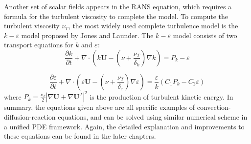 Another set of scalar fields appears in the RANS equation, which requires a formula for the turbulent viscosity to complete the model. To compute the turbulent viscosity $\nu_T$, the most widely used complete turbulence model is the $k-\varepsilon$ model proposed by Jones and Launder\cite{JonesPrediction1972}. The $k-\varepsilon$ model consists of two transport equations for $k$ and $\varepsilon$:
\begin{equation} 
\frac{\partial k}{\partial t}
+\nabla\cdot(k\mathbf{U}
-(\nu+\frac{\nu_T}{\delta_k})\nabla k) 
= P_k - \varepsilon
\end{equation}

\begin{equation} 
\frac{\partial
\varepsilon}{\partial t}+\nabla\cdot(\varepsilon \mathbf{U}
-(\nu+\frac{\nu_T}{\delta_\varepsilon})\nabla \varepsilon)
=\frac{\varepsilon}{k}(C_1P_k-C_2\varepsilon) \label{eq:eps_eqn} \end{equation}
where $P_k = \frac{\nu_T}{2}|\nabla \mathbf{U} + \nabla \mathbf{U}^T|^2$ is the production of turbulent kinetic energy. In summary, the equations given above are all specific examples of convection-diffusion-reaction equations, and can be solved using similar numerical scheme in a unified PDE framework. Again, the detailed explanation and improvements to these equations can be found in the later chapters.

